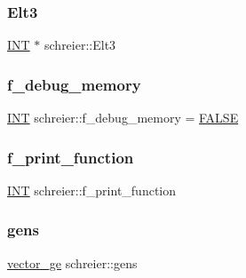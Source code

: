 \mbox{\label{classschreier_a1f8df4737547ac2b3dc39cd202f86c16}} 
\subsubsection{\texorpdfstring{Elt3}{Elt3}}
{\footnotesize\ttfamily \mbox{\hyperlink{galois_8h_a09fddde158a3a20bd2dcadb609de11dc}{I\+NT}} $\ast$ schreier\+::\+Elt3}

\mbox{\label{classschreier_a3b068ae62e10c843a0d0aa23192b4c4b}} 
\subsubsection{\texorpdfstring{f\+\_\+debug\+\_\+memory}{f\_debug\_memory}}
{\footnotesize\ttfamily \mbox{\hyperlink{galois_8h_a09fddde158a3a20bd2dcadb609de11dc}{I\+NT}} schreier\+::f\+\_\+debug\+\_\+memory = \mbox{\hyperlink{nauty_8h_aa93f0eb578d23995850d61f7d61c55c1}{F\+A\+L\+SE}}\hspace{0.3cm}{\ttfamily [static]}}

\mbox{\label{classschreier_a3872ca317d38031e67bee055263866e1}} 
\subsubsection{\texorpdfstring{f\+\_\+print\+\_\+function}{f\_print\_function}}
{\footnotesize\ttfamily \mbox{\hyperlink{galois_8h_a09fddde158a3a20bd2dcadb609de11dc}{I\+NT}} schreier\+::f\+\_\+print\+\_\+function}

\mbox{\label{classschreier_af3dfc4e56f55faa3981755aec24bde82}} 
\subsubsection{\texorpdfstring{gens}{gens}}
{\footnotesize\ttfamily \mbox{\hyperlink{classvector__ge}{vector\+\_\+ge}} schreier\+::gens}

